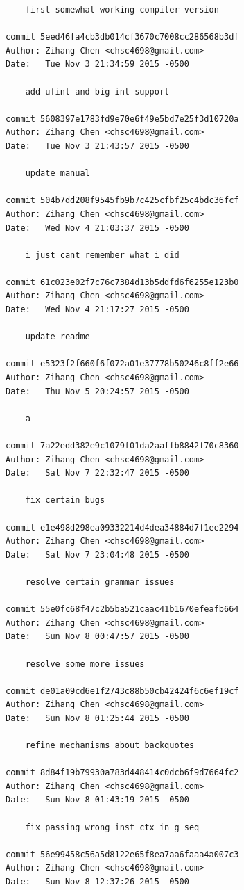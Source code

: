 \documentclass{report}
\begin{document}
\begin{appendices}
\begin{verbatim}
    first somewhat working compiler version

commit 5eed46fa4cb3db014cf3670c7008cc286568b3df
Author: Zihang Chen <chsc4698@gmail.com>
Date:   Tue Nov 3 21:34:59 2015 -0500

    add ufint and big int support

commit 5608397e1783fd9e70e6f49e5bd7e25f3d10720a
Author: Zihang Chen <chsc4698@gmail.com>
Date:   Tue Nov 3 21:43:57 2015 -0500

    update manual

commit 504b7dd208f9545fb9b7c425cfbf25c4bdc36fcf
Author: Zihang Chen <chsc4698@gmail.com>
Date:   Wed Nov 4 21:03:37 2015 -0500

    i just cant remember what i did

commit 61c023e02f7c76c7384d13b5ddfd6f6255e123b0
Author: Zihang Chen <chsc4698@gmail.com>
Date:   Wed Nov 4 21:17:27 2015 -0500

    update readme

commit e5323f2f660f6f072a01e37778b50246c8ff2e66
Author: Zihang Chen <chsc4698@gmail.com>
Date:   Thu Nov 5 20:24:57 2015 -0500

    a

commit 7a22edd382e9c1079f01da2aaffb8842f70c8360
Author: Zihang Chen <chsc4698@gmail.com>
Date:   Sat Nov 7 22:32:47 2015 -0500

    fix certain bugs

commit e1e498d298ea09332214d4dea34884d7f1ee2294
Author: Zihang Chen <chsc4698@gmail.com>
Date:   Sat Nov 7 23:04:48 2015 -0500

    resolve certain grammar issues

commit 55e0fc68f47c2b5ba521caac41b1670efeafb664
Author: Zihang Chen <chsc4698@gmail.com>
Date:   Sun Nov 8 00:47:57 2015 -0500

    resolve some more issues

commit de01a09cd6e1f2743c88b50cb42424f6c6ef19cf
Author: Zihang Chen <chsc4698@gmail.com>
Date:   Sun Nov 8 01:25:44 2015 -0500

    refine mechanisms about backquotes

commit 8d84f19b79930a783d448414c0dcb6f9d7664fc2
Author: Zihang Chen <chsc4698@gmail.com>
Date:   Sun Nov 8 01:43:19 2015 -0500

    fix passing wrong inst ctx in g_seq

commit 56e99458c56a5d8122e65f8ea7aa6faaa4a007c3
Author: Zihang Chen <chsc4698@gmail.com>
Date:   Sun Nov 8 12:37:26 2015 -0500


\end{verbatim}
\end{appendices}
\end{document}
